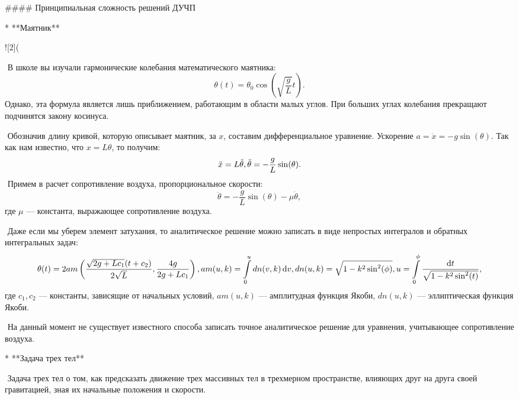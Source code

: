 #### Принципиальная сложность решений ДУЧП

* **Маятник**

![2](%

   ​    В школе вы изучали гармонические колебания математического маятника:
$$
   \theta(t) = \theta_0\cos(\sqrt{\frac{g}{L}}t).
$$
   ​    Однако, эта формула является лишь приближением, работающим в области малых углов. При больших углах колебания прекращают подчинятся закону косинуса. 

   ​    Обозначив длину кривой, которую описывает маятник, за $x$, составим дифференциальное уравнение. Ускорение $a = \ddot x = -g \sin(\theta)$. Так как нам известно, что $x = L\theta$, то получим:
$$
\ddot x = L\ddot\theta,\\
   \ddot \theta = -\frac{g}{L}\sin(\theta).
$$
   ​    Примем в расчет сопротивление воздуха, пропорциональное скорости:
$$
   \ddot \theta = -\frac{g}{L}\sin(\theta) - \mu\dot\theta,
$$
   где $\mu$ — константа, выражающее сопротивление воздуха.

   ​    Даже если мы уберем элемент затухания, то аналитическое решение можно записать в виде непростых интегралов и обратных интегральных задач:
$$
   \theta(t) = 2am\left(\frac{\sqrt{2g + Lc_1}(t+c_2)}{2\sqrt L}, \frac{4g}{2g+Lc_1}\right),\\
   am(u,k) = \int\limits_0^u dn(v,k)\, \mathrm{d}v,\\
   dn(u,k) = \sqrt{1 - k^2\sin^2(\phi)},\\
   u = \int\limits_0^\phi \frac{\mathrm{d}t}{\sqrt{1 - k^2\sin^2(t)}},
$$
   где $c_1, c_2$ — константы, зависящие от начальных условий, $am(u,k)$ — амплитудная функция Якоби, $dn(u,k)$ — эллиптическая функция Якоби.

   ​    На данный момент не существует известного способа записать точное аналитическое решение для уравнения, учитывающее сопротивление воздуха.

* **Задача трех тел**

  ​	Задача трех тел о том, как предсказать движение трех массивных тел в трехмерном пространстве, влияющих друг на друга своей гравитацией, зная их начальные положения и скорости.

